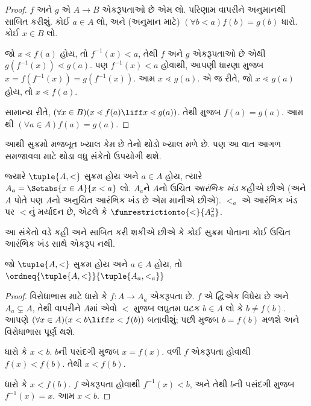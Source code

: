 \begin{proof}
$f$ અને $g$ એ $A \to B$ એકરૂપતાઓ છે એમ લો.
પરિણામ  વાપરીને અનુમાનથી
સાબિત કરીશું.
કોઈ $a\in A$ લો, અને (અનુમાન માટે)
$(\forall b < a)f(b) = g(b)$ ધારો. કોઈ $x \in B$ લો.

જો $x \lessdot f(a)$ હોય, તો $f^{-1}(x) < a$,
તેથી $f$ અને $g$ એકરૂપતાઓ છે એથી
$g(f^{-1}(x)) \lessdot
g(a)$. પણ $f^{-1}(x) < a$ હોવાથી, આપણી ધારણા મુજબ
$x =f(f^{-1}(x)) = g(f^{-1}(x))$.
આમ $x \lessdot g(a)$. એ જ રીતે, જો
$x \lessdot g(a)$ હોય, તો $x \lessdot f(a)$.

સામાન્ય રીતે,
$(\forall x \in B)(x \lessdot f(a) \liff x \lessdot
g(a))$. તેથી
મુજબ $f(a) = g(a)$. આમ
થી
$(\forall
a \in A)f(a) = g(a)$.
\end{proof}\noindent
આથી સુક્રમો મજબૂત ખ્યાલ કેમ છે તેનો થોડો ખ્યાલ મળે છે.
પણ આ વાત આગળ સમજાવવા માટે થોડા વધુ સંકેતો ઉપયોગી થશે.

\begin{defn}
જ્યારે $\tuple{A, <}$ સુક્રમ હોય અને $a \in A$ હોય, ત્યારે
$A_a = \Setabs{x \in A}{x
< a}$ લો. $A_a$ને $A$નો ઉચિત \emph{આરંભિક ખંડ} કહીએ
છીએ (અને $A$ પોતે પણ $A$નો અનુચિત આરંભિક ખંડ છે એમ માનીએ છીએ).
$<_a$ એ આરંભિક ખંડ પર $<$નું મર્યાદન છે, એટલે કે
$\funrestrictionto{\mathord{<}}{A_a^2}$.
\end{defn}
\noindent
આ સંકેતો વડે કહી અને સાબિત કરી શકીએ છીએ કે કોઈ સુક્રમ
પોતાના કોઈ ઉચિત આરંભિક ખંડ સાથે એકરૂપ નથી.

\begin{lem}
જો $\tuple{A, <}$ સુક્રમ હોય અને $a \in A$ હોય, તો
$\ordneq{\tuple{A, <}}{\tuple{A_a, <_a}}$
\end{lem}

\begin{proof}
વિરોધાભાસ માટે ધારો કે $f \colon A \to A_a$ એકરૂપતા
છે. $f$ એ દ્વિએક વિધેય છે અને $A_a \subsetneq A$,
તેથી  વાપરીને
$A$માં એવો $<$ મુજબ લઘુતમ ઘટક $b \in A$ લો
કે $b \neq f(b)$. આપણે
$(\forall x \in A)(x<b \liff x < f(b))$ બતાવીશું;
પછી
મુજબ $b =
f(b)$ મળશે અને વિરોધાભાસ પૂર્ણ થશે.

ધારો કે $x < b$. $b$ની પસંદગી મુજબ $x = f(x)$.
વળી $f$ એકરૂપતા હોવાથી $f(x) <
f(b)$. તેથી $x < f(b)$.

ધારો કે $x < f(b)$. $f$ એકરૂપતા હોવાથી
$f^{-1}(x) < b$, અને તેથી $b$ની પસંદગી મુજબ
$f^{-1}(x) = x$. આમ $x < b$.
\end{proof}

